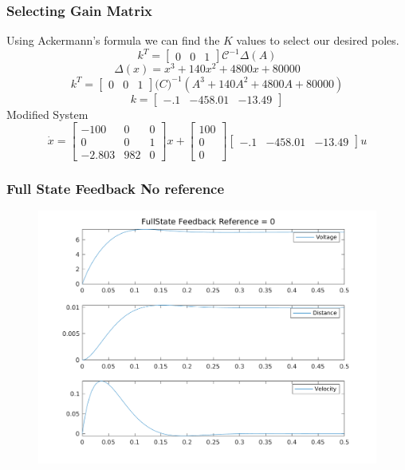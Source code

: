 \documentclass{beamer}
\begin{document}
\begin{frame}
\frametitle{Selecting Gain Matrix}
Using Ackermann's formula we can find the $K$ values to select our desired poles.
$$ k^T = \begin{bmatrix}0 & 0 & 1 \end{bmatrix} \mathcal{C}^{-1} \Delta(A) $$
$$ \Delta(x) = x^3 + 140x^2 + 4800x + 80000 $$
$$ k^T =
\begin{bmatrix}0 & 0 & 1 \end{bmatrix}
\mathcal(C)^{-1}
(A^3 + 140A^2 +4800A + 80000)
$$
$$ k = \begin{bmatrix} -.1 & -458.01 & -13.49 \end{bmatrix} $$
Modified System
$$
\dot{x} =
\begin{bmatrix}
-100 & 0 & 0 \\
0 & 0 & 1 \\
-2.803 & 982 & 0
\end{bmatrix}
x +
\begin{bmatrix} 100 \\ 0 \\ 0\end{bmatrix}
\begin{bmatrix} -.1 & -458.01 & -13.49 \end{bmatrix}
u
$$

\end{frame}

\begin{frame}
\frametitle{Full State Feedback No reference}
\begin{figure}
\includegraphics[scale=.5]{images/FullState_Feedback_ref_0.png}
\end{figure}
\end{frame}
\end{document}
